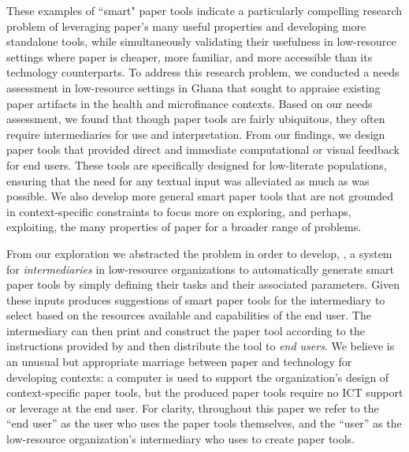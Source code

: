\documentclass{sig-alternate}
\begin{document}
These examples of ``smart" paper tools indicate a particularly compelling research problem of leveraging paper's many useful properties and developing more standalone tools, while simultaneously validating their usefulness in low-resource settings where paper is cheaper, more familiar, and more accessible than its technology counterparts. To address this research problem, we conducted a needs assessment in low-resource settings in Ghana that sought to appraise existing paper artifacts in the health and microfinance contexts. Based on our needs assessment, we found that though paper tools are fairly ubiquitous, they often require intermediaries for use and interpretation. From our findings, we design paper tools that provided direct and immediate computational or visual feedback for end users. These tools are specifically designed for low-literate populations, ensuring that the need for any textual input was alleviated as much as was possible. We also develop more general smart paper tools that are not grounded in context-specific constraints to focus more on exploring, and perhaps, exploiting, the many properties of paper for a broader range of problems.

From our exploration we abstracted the problem in order to develop, \nifty, a system for \emph{intermediaries} in low-resource organizations to automatically generate smart paper tools by simply defining their tasks and their associated parameters. Given these inputs \nifty produces suggestions of smart paper tools for the intermediary to select based on the resources available and capabilities of the end user. The intermediary can then print and construct the paper tool according to the instructions provided by \nifty and then distribute the tool to \emph{end users}. We believe \nifty is an unusual but appropriate marriage between paper and technology for developing contexts: a computer is used to support the organization's design of context-specific paper tools, but the produced paper tools require no ICT support or leverage at the end user. For clarity, throughout this paper we refer to the ``end user'' as the user who uses the paper tools themselves, and the ``user'' as the low-resource organization's intermediary who uses \nifty to create paper tools.
\end{document}
